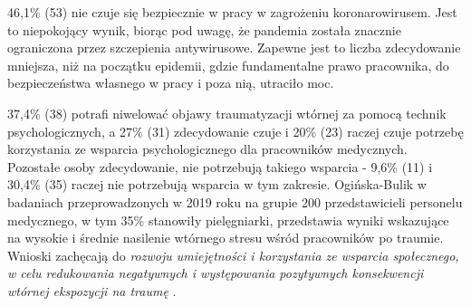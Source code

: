 \documentclass[a4paper,12pt,twoside,openright]{mwrep}
\begin{document}
46,1\% (53) nie  czuje się bezpiecznie w pracy w zagrożeniu koronarowirusem. Jest to niepokojący wynik, biorąc pod uwagę, że pandemia została znacznie ograniczona przez szczepienia antywirusowe. Zapewne jest to liczba zdecydowanie mniejsza, niż na początku epidemii, gdzie fundamentalne prawo pracownika, do bezpieczeństwa własnego w pracy i poza nią, utraciło moc.

 37,4\% (38) potrafi niwelować objawy traumatyzacji wtórnej za pomocą technik psychologicznych, a 27\% (31) zdecydowanie czuje i 20\% (23) raczej czuje potrzebę korzystania ze wsparcia psychologicznego dla pracowników medycznych. Pozostałe osoby zdecydowanie, nie potrzebują takiego wsparcia - 9,6\%  (11) i 30,4\% (35) raczej nie potrzebują wsparcia w tym zakresie. Ogińska-Bulik w badaniach przeprowadzonych w 2019 roku na grupie 200 przedstawicieli personelu medycznego, w tym 35\% stanowiły pielęgniarki, przedstawia wyniki wskazujące na wysokie i średnie nasilenie wtórnego stresu wśród pracowników po traumie. Wnioski zachęcają do \textit{rozwoju umiejętności i korzystania ze wsparcia społecznego, w celu redukowania negatywnych i występowania pozytywnych konsekwencji wtórnej ekspozycji na traumę} \cite{trauma}. 
\end{document}
